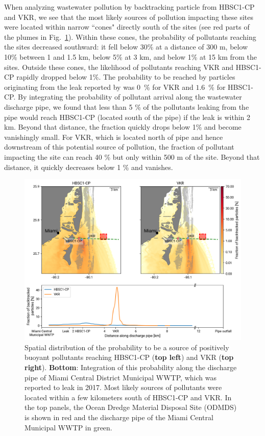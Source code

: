 \documentclass[preprint,12pt,authoryear]{elsarticle}
\begin{document}
When analyzing wastewater pollution by backtracking particle from HBSC1-CP and VKR, we see that the most likely sources of pollution impacting these sites were located within narrow ``cones" directly south of the sites (see red parts of the plumes in Fig.~\ref{fig:backtrack}). Within these cones, the probability of pollutants reaching the sites decreased southward: it fell below 30\% at a distance of 300 m, below 10\% between 1 and 1.5 km, below 5\% at 3 km, and below 1\% at 15 km from the sites. Outside these cones, the likelihood of pollutants reaching VKR and HBSC1-CP rapidly dropped below 1\%. The probability to be reached by particles originating from the leak reported by \cite{staletovich2017} was $0$~\% for VKR and $1.6$~\% for HBSC1-CP. By integrating the probability of pollutant arrival along the wastewater discharge pipe, we found that less than 5 \% of the pollutants leaking from the pipe would reach HBSC1-CP (located south of the pipe) if the leak is within 2 km. Beyond that distance, the fraction quickly drops below 1\% and become vanishingly small. For VKR, which is located north of pipe and hence downstream of this potential source of pollution, the fraction of pollutant impacting the site can reach 40 \% but only within 500 m of the site. Beyond that distance, it quickly decreases below 1 \% and vanishes.

\begin{figure}
    \centering
    \includegraphics[width=.98\textwidth]{figures/fig_proba_stokes_v2.png}
    \caption{Spatial distribution of the probability to be a source of positively buoyant pollutants reaching HBSC1-CP (\textbf{top left}) and VKR (\textbf{top right}). \textbf{Bottom}: Integration of this probability along the discharge pipe of Miami Central District Municipal WWTP, which was reported to leak in 2017. Most likely sources of pollutants were located within a few kilometers south of HBSC1-CP and VKR. In the top panels, the Ocean Dredge Material Disposal Site (ODMDS) is shown in red and the discharge pipe of the Miami Central Municipal WWTP in green.}
    \label{fig:backtrack}
\end{figure}
\end{document}
